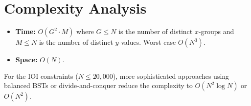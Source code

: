 \documentclass[11pt,a4paper]{article}
\begin{document}
\section{Complexity Analysis}
\begin{itemize}
  \item \textbf{Time:} $O(G^2 \cdot M)$ where $G \le N$ is the number
        of distinct $x$-groups and $M \le N$ is the number of distinct
        $y$-values. Worst case $O(N^3)$.
  \item \textbf{Space:} $O(N)$.
\end{itemize}

For the IOI constraints ($N \le 20{,}000$), more sophisticated
approaches using balanced BSTs or divide-and-conquer reduce the
complexity to $O(N^2 \log N)$ or $O(N^2)$.
\end{document}
